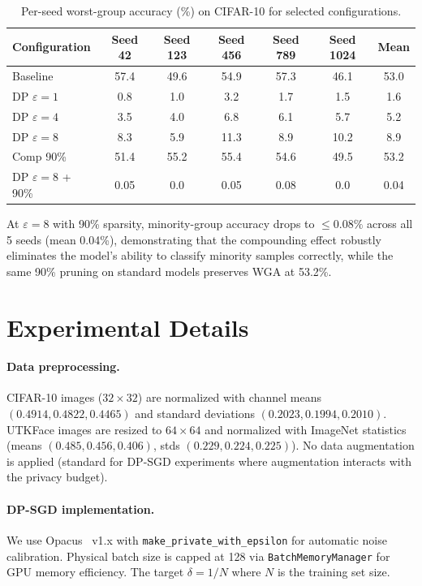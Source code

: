 \documentclass{article}
\begin{document}
\begin{table}[h]
\caption{Per-seed worst-group accuracy (\%) on CIFAR-10 for selected configurations.}
\label{tab:per_seed_cifar10}
\centering
\small
\begin{tabular}{lcccccc}
\toprule
Configuration & Seed 42 & Seed 123 & Seed 456 & Seed 789 & Seed 1024 & Mean \\
\midrule
Baseline & 57.4 & 49.6 & 54.9 & 57.3 & 46.1 & 53.0 \\
DP $\varepsilon{=}1$ & 0.8 & 1.0 & 3.2 & 1.7 & 1.5 & 1.6 \\
DP $\varepsilon{=}4$ & 3.5 & 4.0 & 6.8 & 6.1 & 5.7 & 5.2 \\
DP $\varepsilon{=}8$ & 8.3 & 5.9 & 11.3 & 8.9 & 10.2 & 8.9 \\
Comp 90\% & 51.4 & 55.2 & 55.4 & 54.6 & 49.5 & 53.2 \\
DP $\varepsilon{=}8$ + 90\% & 0.05 & 0.0 & 0.05 & 0.08 & 0.0 & 0.04 \\
\bottomrule
\end{tabular}
\end{table}

At $\varepsilon = 8$ with 90\% sparsity, minority-group accuracy drops to $\leq 0.08\%$ across all 5 seeds (mean 0.04\%), demonstrating that the compounding effect robustly eliminates the model's ability to classify minority samples correctly, while the same 90\% pruning on standard models preserves WGA at 53.2\%.


\section{Experimental Details}
\label{app:details}

\paragraph{Data preprocessing.}
CIFAR-10 images ($32{\times}32$) are normalized with channel means $(0.4914, 0.4822, 0.4465)$ and standard deviations $(0.2023, 0.1994, 0.2010)$. UTKFace images are resized to $64{\times}64$ and normalized with ImageNet statistics (means $(0.485, 0.456, 0.406)$, stds $(0.229, 0.224, 0.225)$). No data augmentation is applied (standard for DP-SGD experiments where augmentation interacts with the privacy budget).

\paragraph{DP-SGD implementation.}
We use Opacus~\citep{yousefpour2021opacus} v1.x with \texttt{make\_private\_with\_epsilon} for automatic noise calibration. Physical batch size is capped at 128 via \texttt{BatchMemoryManager} for GPU memory efficiency. The target $\delta = 1/N$ where $N$ is the training set size.
\end{document}
